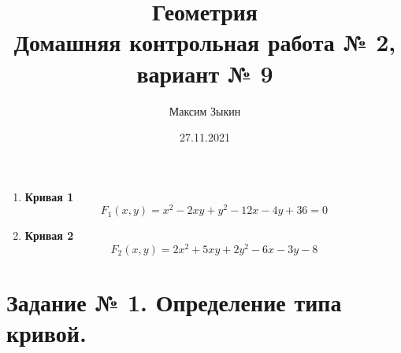 \documentclass{article}
\title{%
  Геометрия \\
  \large Домашняя контрольная работа № 2, вариант № 9}
\author{Максим Зыкин}
\date{27.11.2021}
\theoremstyle{plain}
\newcommand{\boxy}[2]{
    \begin{tcolorbox}[colback=black!5!white,colframe=black, title = {Кривые}]
        #2
    \end{tcolorbox}
}
\begin{document}
\maketitle
\tableofcontents
\vspace{3cm}
\boxy{}{
\begin{enumerate}

\item \textbf{Кривая 1}
$$F_1(x, y) = x^2 - 2xy + y^2 - 12x - 4y + 36 = 0$$
\item \textbf{Кривая 2}
$$
F_2(x, y) = 2x^2 + 5xy + 2y^2 - 6x - 3y - 8
$$ 
\end{enumerate}}
\newpage

\section{Задание № 1. Определение типа кривой.}
\end{document}
